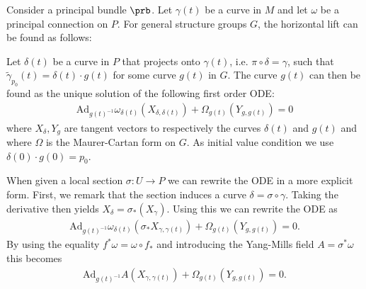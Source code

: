     \begin{method}
        Consider a principal bundle $\prb$. Let $\gamma(t)$ be a curve in $M$ and let $\omega$ be a principal connection on $P$. For general structure groups $G$, the horizontal lift can be found as follows:

        \qquad Let $\delta(t)$ be a curve in $P$ that projects onto $\gamma(t)$, i.e. $\pi\circ\delta=\gamma$, such that $\widetilde\gamma_{p_0}(t)=\delta(t)\cdot g(t)$ for some curve $g(t)$ in $G$. The curve $g(t)$ can then be found as the unique solution of the following first order ODE:
        \begin{gather}
            \label{diff:prin:horizontal_ode}
            \text{Ad}_{g(t)^{-1}}\omega_{\delta(t)}(X_{\delta, \delta(t)}) + \Omega_{g(t)}(Y_{g, g(t)}) = 0
        \end{gather}
        where $X_\delta, Y_g$ are tangent vectors to respectively the curves $\delta(t)$ and $g(t)$ and where $\Omega$ is the Maurer-Cartan form on $G$. As initial value condition we use $\delta(0)\cdot g(0) = p_0$.
    \end{method}
    \begin{remark}
        When given a local section $\sigma:U\rightarrow P$ we can rewrite the ODE in a more explicit form. First, we remark that the section induces a curve $\delta = \sigma\circ\gamma$. Taking the derivative then yields $X_\delta = \sigma_*(X_\gamma)$. Using this we can rewrite the ODE as
        \begin{gather}
            \text{Ad}_{g(t)^{-1}}\omega_{\delta(t)}(\sigma_*X_{\gamma, \gamma(t)}) + \Omega_{g(t)}(Y_{g, g(t)}) = 0.
        \end{gather}
        By using the equality $f^*\omega = \omega\circ f_*$ and introducing the Yang-Mills field $A = \sigma^*\omega$ this becomes
        \begin{gather}
            \text{Ad}_{g(t)^{-1}}A(X_{\gamma, \gamma(t)}) + \Omega_{g(t)}(Y_{g, g(t)}) = 0.
        \end{gather}
    \end{remark}


